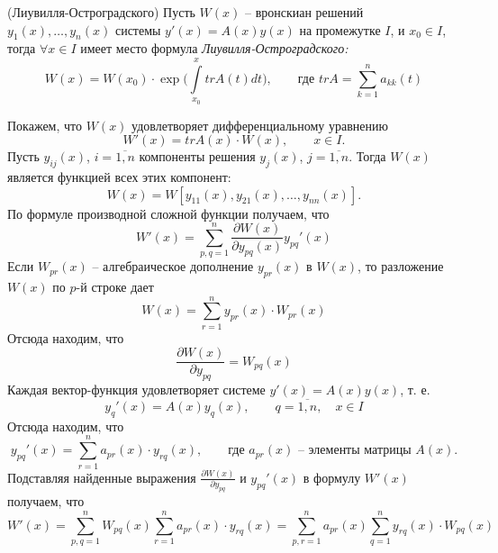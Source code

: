 \Th (Лиувилля-Остроградского) 
\newline Пусть $W(x)$ -- вронскиан решений $y_1(x),\ldots, y_n(x)$ системы $y'(x)=A(x)y(x)$ на промежутке $I$, и $x_0\in I$, тогда $\forall x\in I$ имеет место формула \textit{Лиувилля-Остроградского:}
\begin{equation*}
    W(x) = W(x_0)\cdot \exp{\Big(\int\limits_{x_0}^x trA(t)dt\Big)},
    \qquad \text{где } trA = \sum\limits_{k=1}^n a_{kk}(t)
\end{equation*}

\Proof Покажем, что $W(x)$ удовлетворяет дифференциальному уравнению
\begin{equation*}
    W'(x) = trA(x) \cdot W(x), \qquad x \in I.
\end{equation*}
Пусть $y_{ij}(x)$, $i = \overline{1,n}$ компоненты решения $y_j(x)$, $j = \overline{1,n}$. Тогда $W(x)$ является функцией всех этих компонент:
\begin{equation*}
    W(x) = W[y_{11}(x),y_{21}(x), \ldots ,y_{nn}(x)].
\end{equation*}
По формуле производной сложной функции получаем, что
\begin{equation*}
    W'(x) = \sum\limits_{p,q=1}^{n}\frac{\partial W(x)}{\partial y_{pq}(x)}y_{pq}'(x)
\end{equation*}
Если $W_{pr}(x)$ -- алгебраическое дополнение $y_{pr}(x)$ в $W(x)$, то разложение
$W(x)$ по $p$-й строке дает
\begin{equation*}
    W(x) = \sum\limits_{r=1}^{n}y_{pr}(x)\cdot W_{pr}(x)
\end{equation*}
Отсюда находим, что
\begin{equation*}
    \frac{\partial W(x)}{\partial y_{pq}} = W_{pq}(x)
\end{equation*}
Каждая вектор-функция удовлетворяет системе $y'(x)=A(x)y(x)$, т. е.
\begin{equation*}
    y_{q}'(x) = A(x)y_q(x), \qquad q = \overline{1,n}, \quad x \in I
\end{equation*}
Отсюда находим, что
\begin{equation*}
     y_{pq}'(x) = \sum\limits_{r=1}^{n}a_{pr}(x)\cdot y_{rq}(x), \qquad \text{где $a_{pr}(x)$ -- элементы матрицы $A(x)$.}
\end{equation*}
Подставляя найденные выражения $\frac{\partial W(x)}{\partial y_{pq}}$ и $y_{pq}'(x)$ в формулу $W'(x)$ получаем, что
\begin{equation*}
    W'(x) = \sum\limits_{p,q=1}^{n}W_{pq}(x)\sum\limits_{r=1}^{n}a_{pr}(x)\cdot y_{rq}(x) = \sum\limits_{p,r=1}^{n}a_{pr}(x)\sum\limits_{q=1}^{n}y_{rq}(x)\cdot W_{pq}(x)
\end{equation*}
